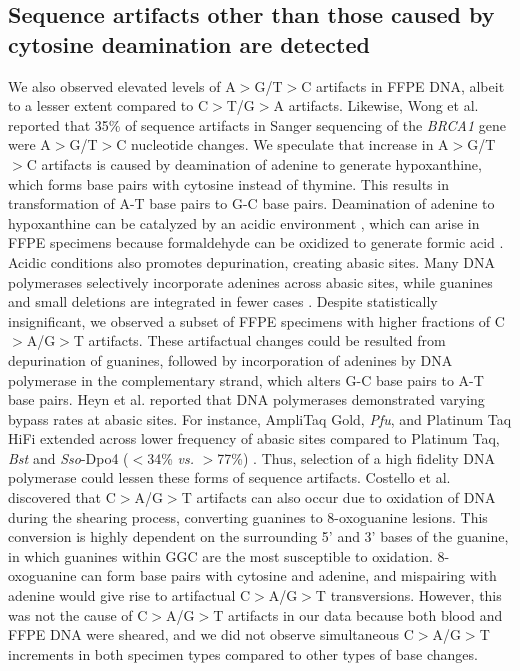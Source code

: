 \subsection{Sequence artifacts other than those caused by cytosine deamination are detected}

We also observed elevated levels of A$>$G/T$>$C artifacts in FFPE DNA, albeit to a lesser extent compared to C$>$T/G$>$A artifacts. Likewise, Wong et al. \cite{Wong1998} reported that 35\% of sequence artifacts in Sanger sequencing of the \textit{BRCA1} gene were A$>$G/T$>$C nucleotide changes. We speculate that increase in A$>$G/T$>$C artifacts is caused by deamination of adenine to generate hypoxanthine, which forms base pairs with cytosine instead of thymine. This results in transformation of A-T base pairs to G-C base pairs. Deamination of adenine to hypoxanthine can be catalyzed by an acidic environment \cite{Wang2010}, which can arise in FFPE specimens because formaldehyde can be oxidized to generate formic acid \cite{Do2015a}. Acidic conditions also promotes depurination, creating abasic sites. Many DNA polymerases selectively incorporate adenines across abasic sites, while guanines and small deletions are integrated in fewer cases \cite{Heyn2010}. Despite statistically insignificant, we observed a subset of FFPE specimens with higher fractions of C$>$A/G$>$T artifacts. These artifactual changes could be resulted from depurination of guanines, followed by incorporation of adenines by DNA polymerase in the complementary strand, which alters G-C base pairs to A-T base pairs. Heyn et al. \cite{Heyn2010} reported that DNA polymerases demonstrated varying bypass rates at abasic sites. For instance, AmpliTaq Gold, \textit{Pfu}, and Platinum Taq HiFi extended across lower frequency of abasic sites compared to Platinum Taq, \textit{Bst} and \textit{Sso}-Dpo4 ($<$34\% \textit{vs.} $>$77\%) \cite{Heyn2010}. Thus, selection of a high fidelity DNA polymerase could lessen these forms of sequence artifacts. Costello et al. \cite{Costello2013} discovered that C$>$A/G$>$T artifacts can also occur due to oxidation of DNA during the shearing process, converting guanines to 8-oxoguanine lesions. This conversion is highly dependent on the surrounding 5' and 3' bases of the guanine, in which guanines within GGC are the most susceptible to oxidation. 8-oxoguanine can form base pairs with cytosine and adenine, and mispairing with adenine would give rise to artifactual C$>$A/G$>$T transversions. However, this was not the cause of C$>$A/G$>$T artifacts in our data because both blood and FFPE DNA were sheared, and we did not observe simultaneous C$>$A/G$>$T increments in both specimen types compared to other types of base changes.

